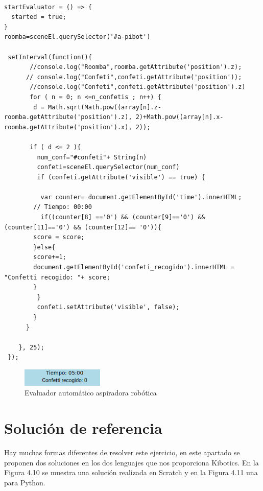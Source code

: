 \begin{lstlisting}

startEvaluator = () => {
  started = true;
}
roomba=sceneEl.querySelector('#a-pibot')

 setInterval(function(){
       //console.log("Roomba",roomba.getAttribute('position').z);
      // console.log("Confeti",confeti.getAttribute('position'));
       //console.log("Confeti",confeti.getAttribute('position').z)
       for ( n = 0; n <=n_confetis ; n++) {
        d = Math.sqrt(Math.pow((array[n].z-roomba.getAttribute('position').z), 2)+Math.pow((array[n].x-roomba.getAttribute('position').x), 2));

       if ( d <= 2 ){
         num_conf="#confeti"+ String(n)
         confeti=sceneEl.querySelector(num_conf)
         if (confeti.getAttribute('visible') == true) {
	      
	      var counter= document.getElementById('time').innerHTML;
		// Tiempo: 00:00	
	      if((counter[8] =='0') && (counter[9]=='0') && (counter[11]=='0') && (counter[12]== '0')){      
		score = score;
		}else{
		score+=1;
		document.getElementById('confeti_recogido').innerHTML = "Confetti recogido: "+ score;
		}
         }
         confeti.setAttribute('visible', false);
        }
      }
	
    }, 25);
 });
\end{lstlisting}

 \begin{figure}[H]
  \centering
 \includegraphics[width=0.35\textwidth]{chapters/images/evaluadoraspiradora.png}
  \caption{Evaluador automático aspiradora robótica}
\end{figure}
\section{Solución de referencia}

Hay muchas formas diferentes  de resolver este ejercicio, en este apartado se proponen dos soluciones en los dos lenguajes que nos proporciona Kibotics. En la Figura 4.10 se muestra una solución realizada en Scratch y en la Figura 4.11 una para Python.


